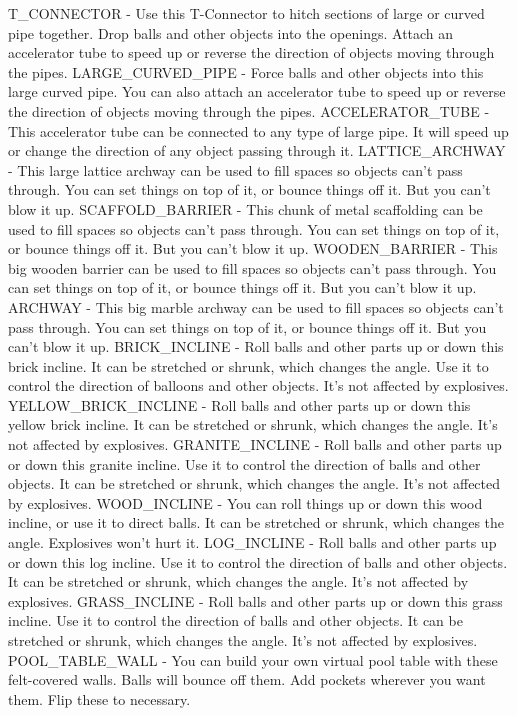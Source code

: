 T_CONNECTOR - Use this T-Connector to hitch sections of large or curved pipe together. Drop balls and other objects into the openings. Attach an accelerator tube to speed up or reverse the direction of objects moving through the pipes.
LARGE_CURVED_PIPE - Force balls and other objects into this large curved pipe. You can also attach an accelerator tube to speed up or reverse the direction of objects moving through the pipes.
ACCELERATOR_TUBE - This accelerator tube can be connected to any type of large pipe. It will speed up or change the direction of any object passing through it.
LATTICE_ARCHWAY - This large lattice archway can be used to fill spaces so objects can't pass through. You can set things on top of it, or bounce things off it. But you can't blow it up.
SCAFFOLD_BARRIER - This chunk of metal scaffolding can be used to fill spaces so objects can't pass through. You can set things on top of it, or bounce things off it. But you can't blow it up.
WOODEN_BARRIER - This big wooden barrier can be used to fill spaces so objects can't pass through. You can set things on top of it, or bounce things off it. But you can't blow it up.
ARCHWAY - This big marble archway can be used to fill spaces so objects can't pass through. You can set things on top of it, or bounce things off it. But you can't blow it up.
BRICK_INCLINE - Roll balls and other parts up or down this brick incline. It can be stretched or shrunk, which changes the angle. Use it to control the direction of balloons and other objects. It's not affected by explosives.
YELLOW_BRICK_INCLINE - Roll balls and other parts up or down this yellow brick incline. It can be stretched or shrunk, which changes the angle. It's not affected by explosives.
GRANITE_INCLINE - Roll balls and other parts up or down this granite incline. Use it to control the direction of balls and other objects. It can be stretched or shrunk, which changes the angle. It's not affected by explosives.
WOOD_INCLINE - You can roll things up or down this wood incline, or use it to direct balls. It can be stretched or shrunk, which changes the angle. Explosives won't hurt it.
LOG_INCLINE - Roll balls and other parts up or down this log incline. Use it to control the direction of balls and other objects. It can be stretched or shrunk, which changes the angle. It's not affected by explosives.
GRASS_INCLINE - Roll balls and other parts up or down this grass incline. Use it to control the direction of balls and other objects. It can be stretched or shrunk, which changes the angle. It's not affected by explosives.
POOL_TABLE_WALL - You can build your own virtual pool table with these felt-covered walls. Balls will bounce off them. Add pockets wherever you want them. Flip these to necessary.
